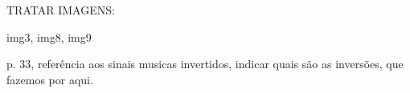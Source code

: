 TRATAR IMAGENS:

img3, img8, img9


p. 33, referência aos sinais musicas invertidos, indicar quais são as inversões, que fazemos por aqui.